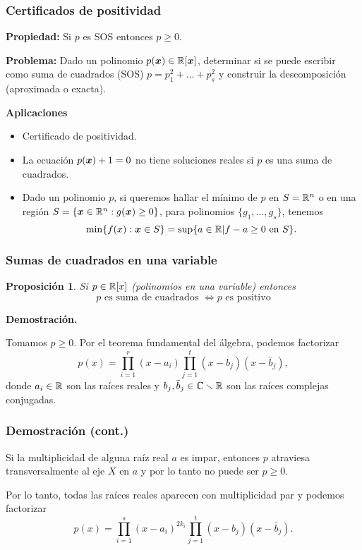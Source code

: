 \documentclass[aspectratio=169,12pt,spanish]{beamer}
\newtheorem{proposition}[theorem]{Proposición}
\begin{document}
\begin{frame}

\frametitle{Certificados de positividad}

\textbf{Propiedad:} Si $p$ es SOS entonces $p \ge 0$.

\textbf{Problema:} Dado un polinomio $p(\bm{x}) \in \mathbb{R}[\bm{x}]$, determinar si se puede escribir como suma de cuadrados (SOS) $p = p_1^2 + \dots + p_s^2$ y construir la descomposici\'on (aproximada o exacta).


{\bf Aplicaciones}

\begin{itemize}
\item Certificado de positividad.
\item La ecuación $p(\bm{x}) + 1 = 0$ no tiene soluciones reales si $p$ es una suma de cuadrados.
\item Dado un polinomio $p$, si queremos hallar el mínimo de $p$ en $S = \mathbb{R}^n$ o en una regi\'on $S = \{ \bm{x} \in \mathbb{R}^n : g(\bm{x}) \ge 0\}$, para polinomios $\{g_1, \dots, g_s\}$, tenemos
\[
\min\{f(x) : \bm{x} \in S\} = \sup\{a \in \mathbb{R} | f - a \ge 0 \text{ en } S\}.
\]

\end{itemize}


\end{frame}


\begin{frame}

\frametitle{Sumas de cuadrados en una variable}

\begin{proposition}
Si $p \in \mathbb{R}[x]$ (polinomios en una variable) entonces
$$
p \text{ es suma de cuadrados } \iff p \text{ es positivo}
$$
\end{proposition}


\textbf{Demostraci\'on.}

Tomamos $p \ge 0$. Por el teorema fundamental del \'algebra, podemos factorizar
\[
p(x) = \prod_{i=1}^r (x-a_i) \prod_{j=1}^t (x-b_j)(x - \bar b_j),
\]
donde $a_i \in \mathbb{R}$ son las raíces reales y $b_j, \bar b_j \in \mathbb{C} \smallsetminus \mathbb{R}$ son las raíces complejas conjugadas.

\end{frame}


\begin{frame}

\frametitle{Demostración (cont.)}
Si la multiplicidad de alguna raíz real $a$ es impar, entonces $p$ atraviesa transversalmente al eje $X$ en $a$ y por lo tanto no puede ser $p \ge 0$.

Por lo tanto, todas las raíces reales aparecen con multiplicidad par y podemos factorizar
\[
p(x) = \prod_{i=1}^s (x-a_i)^{2k_i} \prod_{j=1}^t (x-b_j)(x - \bar b_j).
\]

\end{frame}
\end{document}
